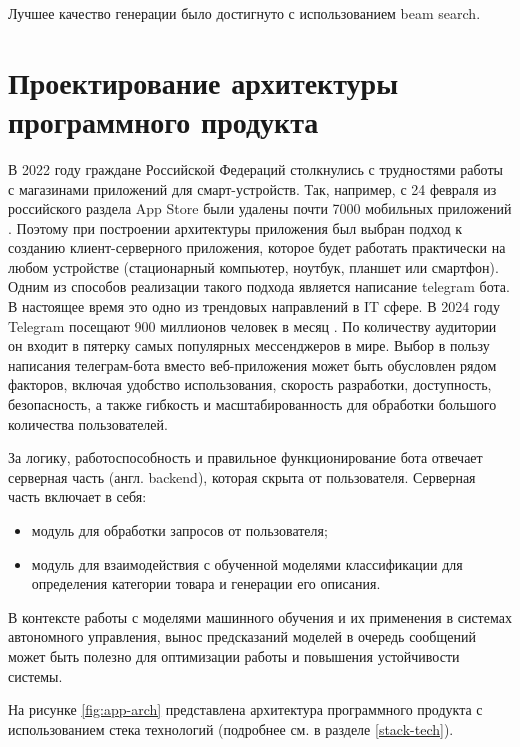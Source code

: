 \documentclass[a4paper,12pt]{extarticle}
\begin{document}
Лучшее качество генерации было достигнуто с использованием beam search.

\newpage
\section{Проектирование архитектуры программного продукта}
В 2022 году граждане Российской Федераций столкнулись с трудностями работы с магазинами приложений для смарт-устройств. Так, например, с 24 февраля из российского раздела App Store были удалены почти 7000 мобильных приложений \cite{russiaapp}. Поэтому при построении архитектуры приложения был выбран подход к созданию клиент-серверного приложения, которое будет работать практически на любом устройстве (стационарный компьютер, ноутбук, планшет или смартфон). Одним из способов реализации такого подхода является написание telegram  бота. В настоящее время это одно из трендовых направлений в IT сфере. В 2024 году Telegram посещают 900 миллионов человек в месяц \cite{telegram-stats}. По количеству аудитории он входит в пятерку самых популярных мессенджеров в мире. Выбор в пользу написания телеграм-бота вместо веб-приложения может быть обусловлен рядом факторов, включая удобство использования, скорость разработки, доступность, безопасность, а также гибкость и масштабированность для обработки большого количества пользователей.

За логику, работоспособность и правильное функционирование бота 
отвечает серверная часть (англ. backend), которая скрыта от пользователя. Серверная часть включает в себя:
\begin{itemize}
	\item модуль для обработки запросов от пользователя;
	\item модуль для взаимодействия с обученной моделями классификации для определения категории товара и генерации его описания.
\end{itemize}

В контексте работы с моделями машинного обучения и их применения в системах автономного управления, вынос предсказаний моделей в очередь сообщений может быть полезно для оптимизации работы и повышения устойчивости системы.

На рисунке \ref{fig:app-arch} представлена архитектура программного продукта с использованием стека технологий (подробнее см. в разделе \ref{stack-tech}).
\end{document}
